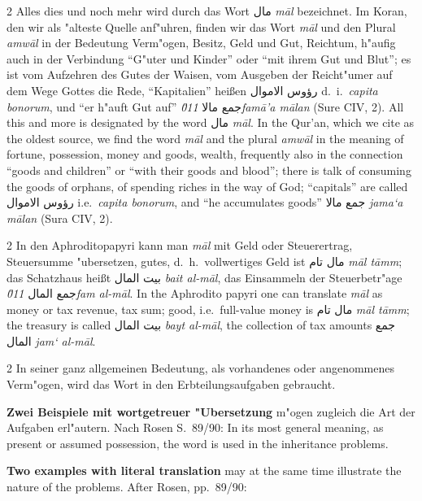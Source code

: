 \documentclass[10pt,a4paper]{article}
\renewcommand{\switchcolumn}{\syncronize\nointerlineskip\columnbreak}
\newcommand{\RL}[1]{\beginR#1\endR}
\newcommand{\ar}[1]{{\arabicfont\RL{#1}}}
\newcommand{\enquote}[1]{``#1''}
\begin{document}
\begin{paracol}{2}
Alles dies und noch mehr wird durch das Wort \ar{مال} \textit{m\=al} bezeichnet. Im Koran, den wir als "alteste Quelle anf"uhren, finden wir das Wort \textit{m\=al} und den Plural \textit{amw\=al} in der Bedeutung Verm"ogen, Besitz, Geld und Gut, Reichtum, h"aufig auch in der Verbindung \enquote{G"uter und Kinder} oder \enquote{mit ihrem Gut und Blut}; es ist vom Aufzehren des Gutes der Waisen, vom Ausgeben der Reicht"umer auf dem Wege Gottes die Rede, \enquote{Kapitalien} hei\ss{}en \ar{رؤوس الاموال} d.\ i.\ \textit{capita bonorum}, und \enquote{er h"auft Gut auf} \ar{جمع مالا} \textit{\u011fam\=a'a m\=alan} (Sure CIV, 2).
\switchcolumn
All this and more is designated by the word \ar{مال} \textit{m\=al}. In the Qur'an, which we cite as the oldest source, we find the word \textit{m\=al} and the plural \textit{amw\=al} in the meaning of fortune, possession, money and goods, wealth, frequently also in the connection ``goods and children'' or ``with their goods and blood''; there is talk of consuming the goods of orphans, of spending riches in the way of God; ``capitals'' are called \ar{رؤوس الاموال} i.e.\ \textit{capita bonorum}, and ``he accumulates goods'' \ar{جمع مالا} \textit{jama`a m\=alan} (Sura CIV, 2).
\end{paracol}

\begin{paracol}{2}
In den Aphroditopapyri kann man \textit{m\=al} mit Geld oder Steuerertrag, Steuersumme "ubersetzen, gutes, d.\ h.\ vollwertiges Geld ist \ar{مال تام} \textit{m\=al t\=amm}; das Schatzhaus hei\ss{}t \ar{بيت المال} \textit{bait al-m\=al}, das Einsammeln der Steuerbetr"age \ar{جمع المال} \textit{\u011fam al-m\=al}.
\switchcolumn
In the Aphrodito papyri one can translate \textit{m\=al} as money or tax revenue, tax sum; good, i.e.\ full-value money is \ar{مال تام} \textit{m\=al t\=amm}; the treasury is called \ar{بيت المال} \textit{bayt al-m\=al}, the collection of tax amounts \ar{جمع المال} \textit{jam` al-m\=al}.
\end{paracol}

\begin{paracol}{2}
In seiner ganz allgemeinen Bedeutung, als vorhandenes oder angenommenes Verm"ogen, wird das Wort in den Erbteilungsaufgaben gebraucht.

\textbf{Zwei Beispiele mit wortgetreuer "Ubersetzung} m"ogen zugleich die Art der Aufgaben erl"autern. Nach Rosen S.\ 89/90:
\switchcolumn
In its most general meaning, as present or assumed possession, the word is used in the inheritance problems.

\textbf{Two examples with literal translation} may at the same time illustrate the nature of the problems. After Rosen, pp.\ 89/90:
\end{paracol}
\end{document}
